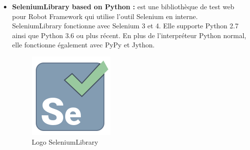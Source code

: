 \begin{itemize}
	\item \textbf{SeleniumLibrary based on Python\cite{seleniumlib} :} est une bibliothèque de test web pour Robot Framework qui utilise l'outil Selenium en interne. SeleniumLibrary fonctionne avec Selenium 3 et 4. Elle supporte Python 2.7 ainsi que Python 3.6 ou plus récent. En plus de l'interpréteur Python normal, elle fonctionne également avec PyPy et Jython. 
	\begin{figure}[H]
		\centering
		\includegraphics[width=0.08\linewidth]{img/logos/selenium}
		\caption[Logo SeleniumLibrary]{Logo SeleniumLibrary}
		\label{fig:selenium}
	\end{figure}


\end{itemize}
